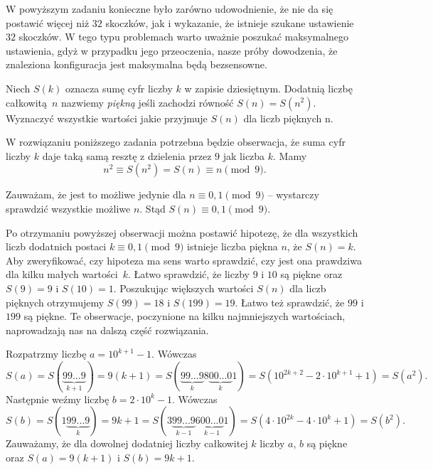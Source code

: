 \noindent
W powyższym zadaniu konieczne było zarówno udowodnienie, że nie da się postawić więcej niż $32$ skoczków, jak i wykazanie, że istnieje szukane ustawienie $32$ skoczków. W tego typu problemach warto uważnie poszukać maksymalnego ustawienia, gdyż w przypadku jego przeoczenia, nasze próby dowodzenia, że znaleziona konfiguracja jest maksymalna będą bezsensowne. 

\vspace{10px}


\noindent
Niech $S(k)$ oznacza sumę cyfr liczby $k$ w zapisie dziesiętnym. Dodatnią liczbę całkowitą~$n$ nazwiemy \textit{piękną} jeśli zachodzi równość $S(n) = S(n^2)$. Wyznaczyć wszystkie wartości jakie przyjmuje $S(n)$ dla liczb pięknych n.

\newpage


\noindent
W rozwiązaniu poniższego zadania potrzebna będzie obserwacja, że suma cyfr liczby $k$ daje taką samą resztę z dzielenia przez $9$ jak liczba $k$. Mamy
\[
    n^2 \equiv S(n^2) = S(n) \equiv n \pmod{9}.
\]

\noindent
Zauważam, że jest to możliwe jedynie dla $n \equiv 0, 1 \pmod{9}$ -- wystarczy sprawdzić wszystkie możliwe $n$. Stąd $S(n) \equiv 0, 1 \pmod{9}$.

\vspace{5px}

\noindent
Po otrzymaniu powyższej obserwacji można postawić hipotezę, że dla wszystkich liczb dodatnich postaci $k \equiv 0, 1 \pmod{9}$ istnieje liczba piękna $n$, że $S(n) = k$. Aby zweryfikować, czy hipoteza ma sens warto sprawdzić, czy jest ona prawdziwa dla kilku małych wartości~$k$. Łatwo sprawdzić, że liczby $9$ i $10$ są piękne oraz $S(9) = 9$ i $S(10) = 1$. Poszukując większych wartości $S(n)$ dla liczb pięknych otrzymujemy $S(99) = 18$ i ${S(199) = 19}$. Łatwo też sprawdzić, że $99$ i $199$ są piękne. Te obserwacje, poczynione na kilku najmniejszych wartościach, naprowadzają nas na dalszą część rozwiązania.

\vspace{5px}

\noindent
Rozpatrzmy liczbę $a = 10^{k + 1} - 1$. Wówczas
\[
    S(a) = S(\underbrace{99...9}_{k+1}) = 9(k + 1) = S(\underbrace{99...9}_{k}8\underbrace{00...0}_{k}1) = S(10^{2k + 2} - 2\cdot 10^{k + 1} + 1) = S(a^2).
\]
Następnie weźmy liczbę $b = 2 \cdot 10^{k} - 1$. Wówczas
\[
    S(b) = S(1\underbrace{99...9}_{k}) = 9k + 1 = S(3\underbrace{99...9}_{k-1}6\underbrace{00...0}_{k-1}1) = S(4\cdot 10^{2k} - 4\cdot 10^{k} + 1) = S(b^2).
\]
Zauważamy, że dla dowolnej dodatniej liczby całkowitej $k$ liczby $a$, $b$ są piękne oraz ${S(a) = 9(k + 1)}$ i $S(b) = 9k + 1$.

